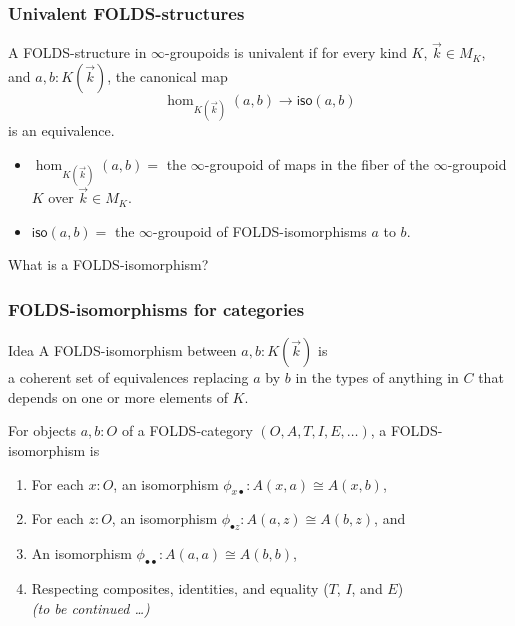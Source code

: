 \documentclass{beamer}
\begin{document}
\begin{frame}
  \frametitle{Univalent FOLDS-structures}
  \begin{definition}
    A FOLDS-structure in $\infty$-groupoids is \alert<1>{univalent} if for every kind $K$, $\vec{k}\in M_K$, and $a,b:K(\vec{k})$, the canonical map
    \[ \hom_{K(\vec{k})}(a,b) \to \mathsf{iso}(a,b) \]
    is an equivalence.
  \end{definition}
  \pause
  \begin{itemize}
  \item $\hom_{K(\vec{k})}(a,b)=$ the $\infty$-groupoid of maps in the fiber of the $\infty$-groupoid $K$ over $\vec{k} \in M_K$.
  \item $\mathsf{iso}(a,b)=$ the $\infty$-groupoid of \alert{FOLDS-isomorphisms} $a$ to $b$.
  \end{itemize}
  What is a FOLDS-isomorphism?
\end{frame}

\begin{frame}[t]
  \frametitle{FOLDS-isomorphisms for categories}
  \begin{block}{Idea}
    A FOLDS-isomorphism between $a,b:K(\vec{k})$ is\\\alert<1>{a coherent set of equivalences replacing $a$ by $b$ in the types of anything in $C$ that depends on one or more elements of $K$}.
  \end{block}
  \pause
  \begin{example}
  For objects $a,b:O$ of a FOLDS-category $(O,A,T,I,E,\dots)$, a FOLDS-isomorphism is
  \begin{enumerate}
  \item For each $x:O$, an isomorphism $\phi_{x\bullet} : A(x,a) \cong A(x,b)$,
  \item For each $z:O$, an isomorphism $\phi_{\bullet z} : A(a,z) \cong A(b,z)$, and
  \item An isomorphism $\phi_{\bullet\bullet} : A(a,a) \cong A(b,b)$,
  \item Respecting composites, identities, and equality ($T$, $I$, and $E$)\\
    \textit{(to be continued \dots)}
  \end{enumerate}
\end{example}
\end{frame}
\end{document}
